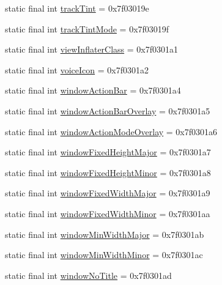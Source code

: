 \begin{DoxyCompactItemize}
\item 
static final int \mbox{\hyperlink{classandroid_1_1support_1_1v7_1_1appcompat_1_1_r_1_1attr_a9027c6a1857ce71f9769073110c6abfc}{track\+Tint}} = 0x7f03019e
\item 
static final int \mbox{\hyperlink{classandroid_1_1support_1_1v7_1_1appcompat_1_1_r_1_1attr_a253097e6cf2e7eff229a8da50651fef9}{track\+Tint\+Mode}} = 0x7f03019f
\item 
static final int \mbox{\hyperlink{classandroid_1_1support_1_1v7_1_1appcompat_1_1_r_1_1attr_a21339e4ef502b283dd6d662e2ef7dda8}{view\+Inflater\+Class}} = 0x7f0301a1
\item 
static final int \mbox{\hyperlink{classandroid_1_1support_1_1v7_1_1appcompat_1_1_r_1_1attr_a60eb48eb37059ce1df644b731021b9a8}{voice\+Icon}} = 0x7f0301a2
\item 
static final int \mbox{\hyperlink{classandroid_1_1support_1_1v7_1_1appcompat_1_1_r_1_1attr_a2bc5a3ef0bedb9e38e1741a20948be3f}{window\+Action\+Bar}} = 0x7f0301a4
\item 
static final int \mbox{\hyperlink{classandroid_1_1support_1_1v7_1_1appcompat_1_1_r_1_1attr_a5fc5e9a4b069a9b599610b2c4f5c662a}{window\+Action\+Bar\+Overlay}} = 0x7f0301a5
\item 
static final int \mbox{\hyperlink{classandroid_1_1support_1_1v7_1_1appcompat_1_1_r_1_1attr_a9f2e4cf261c9c52bb72af80cde2502ec}{window\+Action\+Mode\+Overlay}} = 0x7f0301a6
\item 
static final int \mbox{\hyperlink{classandroid_1_1support_1_1v7_1_1appcompat_1_1_r_1_1attr_a86de19f224da4a883392022e0497452a}{window\+Fixed\+Height\+Major}} = 0x7f0301a7
\item 
static final int \mbox{\hyperlink{classandroid_1_1support_1_1v7_1_1appcompat_1_1_r_1_1attr_ac628c4041d17414ef198ce6f0364281a}{window\+Fixed\+Height\+Minor}} = 0x7f0301a8
\item 
static final int \mbox{\hyperlink{classandroid_1_1support_1_1v7_1_1appcompat_1_1_r_1_1attr_abb30020191b06391ce2c973b999e985a}{window\+Fixed\+Width\+Major}} = 0x7f0301a9
\item 
static final int \mbox{\hyperlink{classandroid_1_1support_1_1v7_1_1appcompat_1_1_r_1_1attr_aac53966a3b02d97f423d030e692e39fa}{window\+Fixed\+Width\+Minor}} = 0x7f0301aa
\item 
static final int \mbox{\hyperlink{classandroid_1_1support_1_1v7_1_1appcompat_1_1_r_1_1attr_a97b91d010aba26efc51cf5abef9717e1}{window\+Min\+Width\+Major}} = 0x7f0301ab
\item 
static final int \mbox{\hyperlink{classandroid_1_1support_1_1v7_1_1appcompat_1_1_r_1_1attr_a42559736432f294a82fae05e842c36f6}{window\+Min\+Width\+Minor}} = 0x7f0301ac
\item 
static final int \mbox{\hyperlink{classandroid_1_1support_1_1v7_1_1appcompat_1_1_r_1_1attr_a46ea84cd8ac398f0d99f1ff7f0e2d100}{window\+No\+Title}} = 0x7f0301ad
\end{DoxyCompactItemize}
